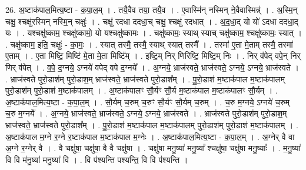 \documentclass[17pt]{extarticle}
\begin{document}
26. अ॒ष्टाक॑पाल॒मित्य॒ष्टा - क॒पा॒ल॒म् । . तयै॒वैव तया॒ तयै॒व । . ए॒वास्मि॑न् नस्मिन् ने॒वैवास्मिन्न्॑ । . अ॒स्मि॒न् चक्षु॒ श्चक्षु॑रस्मिन् नस्मि॒न् चक्षुः॑ । . चक्षु॑ रदधा ददधा॒च् चक्षु॒ श्चक्षु॑ रदधात् । . अ॒द॒धा॒द् यो यो॑ ऽदधा ददधा॒द् यः । . यश्चक्षु॑ष्काम॒ श्चक्षु॑ष्कामो॒ यो यश्चक्षु॑ष्कामः । . चक्षु॑ष्कामः॒ स्याथ् स्याच् चक्षु॑ष्काम॒ श्चक्षु॑ष्कामः॒ स्यात् । . चक्षु॑ष्काम॒ इति॒ चक्षुः॑ - का॒मः॒ । . स्यात् तस्मै॒ तस्मै॒ स्याथ् स्यात् तस्मै᳚ । . तस्मा॑ ए॒ता मे॒ताम् तस्मै॒ तस्मा॑ ए॒ताम् । . ए॒ता मिष्टि॒ मिष्टि॑ मे॒ता मे॒ता मिष्टि᳚म् । . इष्टि॒म् निर् णिरिष्टि॒ मिष्टि॒म् निः । . निर् व॑पेद् वपे॒न् निर् णिर् व॑पेत् । . व॒पे॒ द॒ग्नये॒ ऽग्नये॑ वपेद् वपे द॒ग्नये᳚ । . अ॒ग्नये॒ भ्राज॑स्वते॒ भ्राज॑स्वते॒ ऽग्नये॒ ऽग्नये॒ भ्राज॑स्वते । . भ्राज॑स्वते पुरो॒डाश॑म् पुरो॒डाश॒म् भ्राज॑स्वते॒ भ्राज॑स्वते पुरो॒डाश᳚म् । . पु॒रो॒डाश॑ म॒ष्टाक॑पाल म॒ष्टाक॑पालम् पुरो॒डाश॑म् पुरो॒डाश॑ म॒ष्टाक॑पालम् । . अ॒ष्टाक॑पालꣳ सौ॒र्यꣳ सौ॒र्य म॒ष्टाक॑पाल म॒ष्टाक॑पालꣳ सौ॒र्यम् । . अ॒ष्टाक॑पाल॒मित्य॒ष्टा - क॒पा॒ल॒म् । . सौ॒र्यम् च॒रुम् च॒रुꣳ सौ॒र्यꣳ सौ॒र्यम् च॒रुम् । . च॒रु म॒ग्नये॒ ऽग्नये॑ च॒रुम् च॒रु म॒ग्नये᳚ । . अ॒ग्नये॒ भ्राज॑स्वते॒ भ्राज॑स्वते॒ ऽग्नये॒ ऽग्नये॒ भ्राज॑स्वते । . भ्राज॑स्वते पुरो॒डाश॑म् पुरो॒डाश॒म् भ्राज॑स्वते॒ भ्राज॑स्वते पुरो॒डाश᳚म् । . पु॒रो॒डाश॑ म॒ष्टाक॑पाल म॒ष्टाक॑पालम् पुरो॒डाश॑म् पुरो॒डाश॑ म॒ष्टाक॑पालम् । . अ॒ष्टाक॑पाल म॒ग्ने र॒ग्ने र॒ष्टाक॑पाल म॒ष्टाक॑पाल म॒ग्नेः । . अ॒ष्टाक॑पाल॒मित्य॒ष्टा - क॒पा॒ल॒म् । . अ॒ग्नेर् वै वा अ॒ग्ने र॒ग्नेर् वै । . वै चक्षु॑षा॒ चक्षु॑षा॒ वै वै चक्षु॑षा । . चक्षु॑षा मनु॒ष्या॑ मनु॒ष्या᳚ श्चक्षु॑षा॒ चक्षु॑षा मनु॒ष्याः᳚ । . म॒नु॒ष्या॑ वि वि म॑नु॒ष्या॑ मनु॒ष्या॑ वि । . वि प॑श्यन्ति पश्यन्ति॒ वि वि प॑श्यन्ति । \newline
\end{document}
